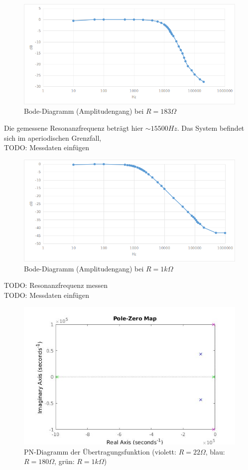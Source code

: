 \documentclass[12pt,a4paper,titlepage]{article}
\begin{document}
\begin{figure}[H]
  \centering
  \includegraphics[width=150mm]{bode_rlc_180.png}
  \caption{Bode-Diagramm (Amplitudengang) bei $R=183\Omega$}
\end{figure}
\noindent Die gemessene Resonanzfrequenz betr\"agt hier $\sim15500Hz$. Das System befindet sich im aperiodischen Grenzfall, \\
TODO: Messdaten einfügen

\begin{figure}[H]
  \centering
  \includegraphics[width=150mm]{bode_rlc_1k.png}
  \caption{Bode-Diagramm (Amplitudengang) bei $R=1k\Omega$}
\end{figure}
TODO: Resonanzfrequenz messen\\
TODO: Messdaten einfügen\\

\begin{figure}[H]
  \centering
  \includegraphics[width=150mm]{pnd.jpg}
  \caption{PN-Diagramm der \"Ubertragungsfunktion (violett: $R=22\Omega$, blau: $R=180\Omega$, gr\"un: $R=1k\Omega$)}
\end{figure}
\end{document}
